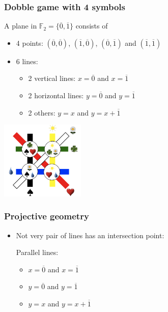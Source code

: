 \documentclass{beamer}
\begin{document}
  \begin{frame}
  	\frametitle{Dobble game with 4 symbols}
		A plane in $\mathbb{F}_2 = \{\overline{0}, \overline{1}\}$ consists of 
		\begin{itemize}
			\item 4 points: $(\overline{0},\overline{0})$, $(\overline{1},\overline{0})$, $(\overline{0},\overline{1})$ and $(\overline{1},\overline{1})$
			\item 6 lines:
			\begin{itemize}
				\item 2 vertical lines: $x = \overline{0}$ and $x = \overline{1}$
				\item 2 horizontal lines: $y = \overline{0}$ and $y = \overline{1}$
				\item 2 others: $y = x$ and $y = x + \overline{1}$
			\end{itemize}
		\end{itemize}
	\begin{center}
		\includegraphics[width=4cm]{images/dobble_4cards}
	\end{center}	
  \end{frame}
  \begin{frame}
  	\frametitle{Projective geometry}
	\begin{itemize}
		\item Not very pair of lines has an intersection point:
		\begin{center}
	\end{center}
	Parallel lines: 
	\begin{itemize}
		\item {\color{red}$x = \overline{0}$} and {\color{red}$x = \overline{1}$}
		\item {\color{green}$y = \overline{0}$} and {\color{green}$y = \overline{1}$}
		\item {\color{blue}$y = x$} and {\color{blue}$y = x + \overline{1}$}
	\end{itemize}
	\end{itemize}
  \end{frame}
\end{document}
